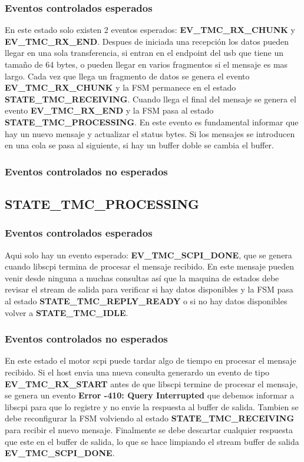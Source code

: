 \subsubsection*{Eventos controlados esperados}
En este estado solo existen 2 eventos esperados: \textbf{EV\_TMC\_RX\_CHUNK} y \textbf{EV\_TMC\_RX\_END}.
Despues de iniciada una recepción los datos pueden llegar en una sola transferencia, si entran en el endpoint del usb que tiene un tamaño de 64 bytes, o pueden llegar en varios fragmentos si el mensaje es mas largo. 
Cada vez que llega un fragmento de datos se genera el evento \textbf{EV\_TMC\_RX\_CHUNK} y la FSM permanece en el estado \textbf{STATE\_TMC\_RECEIVING}. 
Cuando llega el final del mensaje se genera el evento \textbf{EV\_TMC\_RX\_END} y la FSM pasa al estado \textbf{STATE\_TMC\_PROCESSING}. En este evento es fundamental informar que hay un nuevo mensaje y actualizar el status bytes. Si los mensajes se introducen en una cola se pasa al siguiente, si hay un buffer doble se cambia el buffer.

\subsubsection*{Eventos controlados no esperados}

\subsection{STATE\_TMC\_PROCESSING}
\subsubsection{Eventos controlados esperados}
Aqui solo hay un evento esperado: \textbf{EV\_TMC\_SCPI\_DONE}, que se genera cuando libscpi termina de procesar el mensaje recibido. En este mensaje pueden venir desde ninguna a muchas consultas así que la maquina de estados debe revisar el stream de salida para verificar si hay datos disponibles y la FSM pasa al estado \textbf{STATE\_TMC\_REPLY\_READY} o si no hay datos disponibles volver a \textbf{STATE\_TMC\_IDLE}.

\subsubsection{Eventos controlados no esperados}
En este estado el motor scpi puede tardar algo de tiempo en procesar el mensaje recibido. Si el host envia una nueva consulta generardo un evento de tipo \textbf{EV\_TMC\_RX\_START} antes de que libscpi termine de procesar el mensaje, se genera un evento \textbf{Error -410: Query Interrupted} que debemos informar a libscpi para que lo registre y no envie la respuesta al buffer de salida. Tambien se debe reconfigurar la FSM volviendo al estado \textbf{STATE\_TMC\_RECEIVING} para recibir el nuevo mensaje. Finalmente se debe descartar cualquier respuesta que este en el buffer de salida, lo que se hace limpiando el stream buffer de salida \textbf{EV\_TMC\_SCPI\_DONE}.

